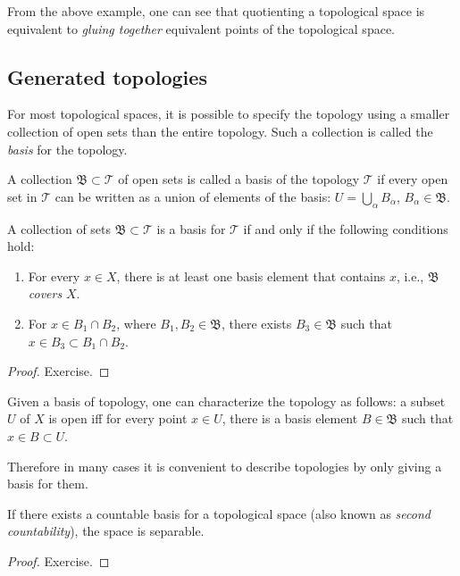 From the above example, one can see that quotienting a topological space is equivalent to \emph{gluing together} equivalent points of the topological space.





\subsection{Generated topologies}

For most topological spaces, it is possible to specify the topology  using a smaller collection of open sets than the entire topology. Such a collection is called the \emph{basis} for the topology.

\begin{defn}[Basis]
    A collection  $\mathfrak{B}\subset \mathcal{T}$ of open sets is called a basis of the topology $\mathcal{T}$ if every open set in $\mathcal{T}$ can be written as a union of elements of the basis: $U=\bigcup_\alpha B_\alpha$, $B_\alpha \in \mathfrak{B}$.
\end{defn}

\begin{prop}
    A collection of sets $\mathfrak{B}\subset\mathcal{T}$ is a basis for $\mathcal{T}$ if and only if the following conditions hold:
\begin{enumerate}
    \item For every $x\in X$, there is at least one basis element that contains $x$, i.e., $\mathfrak{B}$ \emph{covers} $X$.
    \item For $x\in B_1 \cap B_2$, where $B_1,B_2\in\mathfrak{B}$, there exists $B_3\in\mathfrak{B}$ such that $x\in B_3\subset B_1\cap B_2 $.
\end{enumerate}
\end{prop}
\begin{proof}
    Exercise.
\end{proof}
\begin{prop}\label{characterization of topology using basis}
    Given a basis of topology, one can characterize the topology as follows: a subset $U$ of $X$ is open iff for every point $x\in U$, there is a basis element $B\in \mathfrak{B}$ such that $x\in B\subset U$.
\end{prop} 
Therefore in many cases it is convenient to describe topologies by only giving a basis for them.

\begin{prop}
    If there exists a countable basis for a topological space (also known as \emph{second countability}), the space is separable.
\end{prop}
\begin{proof}
    Exercise.
\end{proof}


